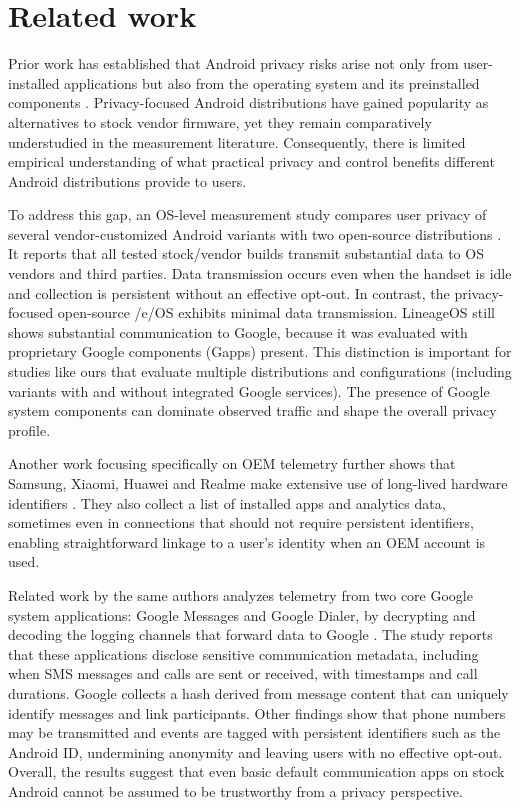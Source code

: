 \section{Related work}

Prior work has established that Android privacy risks arise not only from user-installed applications but also from the operating system and its preinstalled components \cite{android-os-snooping2021,android-os-snooping2023,google-dialer-messages,cookies-identifiers2025,google-data-collection2018}. Privacy-focused Android distributions have gained popularity as alternatives to stock vendor firmware, yet they remain comparatively understudied in the measurement literature. Consequently, there is limited empirical understanding of what practical privacy and control benefits different Android distributions provide to users.

To address this gap, an OS-level measurement study compares user privacy of several vendor-customized Android variants with two open-source distributions \cite{android-os-snooping2021}. It reports that all tested stock/vendor builds transmit substantial data to OS vendors and third parties. Data transmission occurs even when the handset is idle and collection is persistent without an effective opt-out. In contrast, the privacy-focused open-source /e/OS exhibits minimal data transmission. LineageOS still shows substantial communication to Google, because it was evaluated with proprietary Google components (Gapps) present. This distinction is important for studies like ours that evaluate multiple distributions and configurations (including variants with and without integrated Google services). The presence of Google system components can dominate observed traffic and shape the overall privacy profile.

Another work focusing specifically on OEM telemetry further shows that Samsung, Xiaomi, Huawei and Realme make extensive use of long-lived hardware identifiers \cite{android-os-snooping2023}. They also collect a list of installed apps and analytics data, sometimes even in connections that should not require persistent identifiers, enabling straightforward linkage to a user’s identity when an OEM account is used.

Related work by the same authors analyzes telemetry from two core Google system applications: Google Messages and Google Dialer, by decrypting and decoding the logging channels that forward data to Google \cite{google-dialer-messages}. The study reports that these applications disclose sensitive communication metadata, including when SMS messages and calls are sent or received, with timestamps and call durations. Google collects a hash derived from message content that can uniquely identify messages and link participants. Other findings show that phone numbers may be transmitted and events are tagged with persistent identifiers such as the Android ID, undermining anonymity and leaving users with no effective opt-out. Overall, the results suggest that even basic default communication apps on stock Android cannot be assumed to be trustworthy from a privacy perspective.

